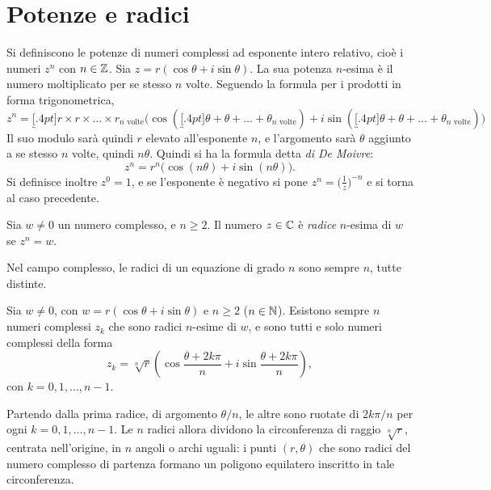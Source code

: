 \section{Potenze e radici}
Si definiscono le potenze di numeri complessi ad esponente intero relativo, cioè i numeri $z^n$ con $n\in\mathbb{Z}$.
Sia $z=r(\cos\theta+i\sin\theta)$. La sua potenza $n$-esima è il numero moltiplicato per se stesso $n$ volte. Seguendo la formula per i prodotti in forma trigonometrica,
\[
z^n=\underbracket[.4pt]{r\times r\times\dots\times r}_\text{$n$ volte}\big(\!\cos(\underbracket[.4pt]{\theta+\theta+\dots+\theta}_\text{$n$ volte})+i\sin(\underbracket[.4pt]{\theta+\theta+\dots+\theta}_\text{$n$ volte})\big)
\]
Il suo modulo sarà quindi $r$ elevato all'esponente $n$, e l'argomento sarà $\theta$ aggiunto a se stesso $n$ volte, quindi $n\theta$. Quindi si ha la formula detta \emph{di De Moivre}:
\begin{equation}
\label{eq:demoivre}
z^n=r^n\big(\!\cos(n\theta)+i\sin(n\theta)\big).
\end{equation}
Si definisce inoltre $z^0=1$, e se l'esponente è negativo si pone $z^n=\big(\frac1{z}\big)^{-n}$ e si torna al caso precedente.
\begin{definizione}
\label{d:radici-c}
Sia $w\neq 0$ un numero complesso, e $n\geq 2$. Il numero $z\in\mathbb{C}$ è \emph{radice} $n$-esima di $w$ se $z^n=w$.
\end{definizione}
Nel campo complesso, le radici di un equazione di grado $n$ sono sempre $n$, tutte distinte.
\begin{teorema}
\label{t:radici-c}
Sia $w\neq 0$, con $w=r(\cos\theta+i\sin\theta)$ e $n\geq 2$ ($n\in\mathbb{N}$). Esistono sempre $n$ numeri complessi $z_k$ che sono radici $n$-esime di $w$, e sono tutti e solo numeri complessi della forma
\begin{equation}
\label{eq:radici-c}
z_k=\sqrt[n]{r}\left(\cos\frac{\theta+2k\pi}{n}+i\sin\frac{\theta+2k\pi}{n}\right),
\end{equation}
con $k=0,1,\dots,n-1$.
\end{teorema}
Partendo dalla prima radice, di argomento $\theta/n$, le altre sono ruotate di $2k\pi/n$ per ogni $k=0,1,\dots,n-1$.
Le $n$ radici allora dividono la circonferenza di raggio $\sqrt[n]{r}$, centrata nell'origine, in $n$ angoli o archi uguali: i punti $(r,\theta)$ che sono radici del numero complesso di partenza formano un poligono equilatero inscritto in tale circonferenza.


